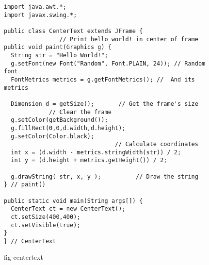 \begin{figure}[h!]
\jjjprogstart
\begin{jjjlisting}[28pc]
\begin{lstlisting}
import java.awt.*;
import javax.swing.*;

public class CenterText extends JFrame {
                // Print hello world! in center of frame
public void paint(Graphics g) {
  String str = "Hello World!";
  g.setFont(new Font("Random", Font.PLAIN, 24)); // Random font
  FontMetrics metrics = g.getFontMetrics(); //  And its metrics

  Dimension d = getSize();       // Get the frame's size
             // Clear the frame
  g.setColor(getBackground());
  g.fillRect(0,0,d.width,d.height);
  g.setColor(Color.black);
                                // Calculate coordinates
  int x = (d.width - metrics.stringWidth(str)) / 2; 
  int y = (d.height + metrics.getHeight()) / 2;

  g.drawString( str, x, y );          // Draw the string
} // paint()

public static void main(String args[]) {
  CenterText ct = new CenterText();
  ct.setSize(400,400);
  ct.setVisible(true);
}
} // CenterText
\end{lstlisting}
\end{jjjlisting}
{fig-centertext}
\end{figure}



\begin{figure}[bt]
\end{figure}


